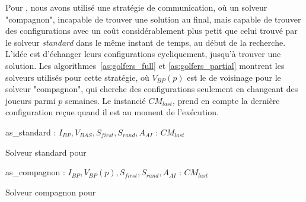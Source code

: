 Pour \SGP{}, nous avons utilisé une stratégie de communication, où un solveur "compagnon", incapable de trouver une solution au final, mais capable de trouver des configurations avec un coût considérablement plus petit que celui trouvé par le solveur \textit{standard} dans le même instant de temps, au début de la recherche. L'idée est d'échanger leurs configurations cycliquement, jusqu'à trouver une solution. Les algorithmes~\ref{as:golfers_full} et \ref{as:golfers_partial} montrent les solveurs utilisés pour cette stratégie, où $V_{BP}(p)$ est le \om{} de voisinage pour le solveur "compagnon", qui cherche des configurations seulement en changeant des joueurs parmi $p$ semaines. Le \opch{} instancié $CM_{last}$, prend en compte la dernière configuration reçue quand il est au moment de l'exécution.

\begin{algorithm}
\dontprintsemicolon
\SetNoline
{}
   as\_standard\;
\algoindent {} : $I_{BP}, V_{BAS}, S_{first}, S_{rand}, A_{AI}$ \;
\algoindent {} : $CM_{last}$ \;
\caption{Solveur standard pour \SGP}\label{as:golfers_full}
\end{algorithm}

\begin{algorithm}
\dontprintsemicolon
\SetNoline
{}
   as\_compagnon\;
\algoindent {} : $I_{BP}, V_{BP}(p), S_{first}, S_{rand}, A_{AI}$ \;
\algoindent {} : $CM_{last}$ \;
\caption{Solveur compagnon pour \SGP}\label{as:golfers_partial}
\end{algorithm}

